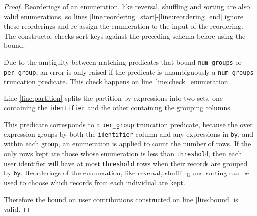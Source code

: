 \documentclass{article}
\begin{document}
\begin{proof}
    Reorderings of an enumeration, like reversal, shuffling and sorting are also valid enumerations,
    so lines \ref{line:reordering_start}-\ref{line:reordering_end} ignore these reorderings and re-assign the enumeration to the input of the reordering.
    The constructor checks sort keys against the preceding schema before using the bound.

    Due to the ambiguity between matching predicates that bound \texttt{num\_groups} or \texttt{per\_group},
    an error is only raised if the predicate is unambiguously a \texttt{num\_groups} truncation predicate.
    This check happens on line \ref{line:check_enumeration}.

    Line \ref{line:partition} splits the partition by expressions into two sets,
    one containing the \texttt{identifier} and the other containing the grouping columns.

    This predicate corresponds to a \texttt{per\_group} truncation predicate,
    because the over expression groups by both the \texttt{identifier} column and any expressions in \texttt{by},
    and within each group, an enumeration is applied to count the number of rows.
    If the only rows kept are those whose enumeration is less than \texttt{threshold},
    then each user identifier will have at most \texttt{threshold} rows when their records are grouped by \texttt{by}.
    Reorderings of the enumeration, like reversal, shuffling and sorting can be used to choose which records from each individual are kept.

    Therefore the bound on user contributions constructed on line \ref{line:bound} is valid.
\end{proof}
\end{document}
